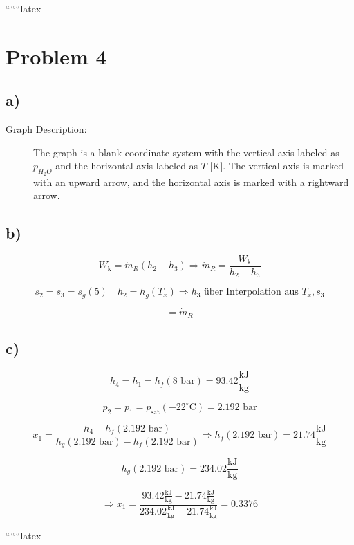 
``````latex


\section*{Problem 4}

\subsection*{a)}

\begin{description}
    \item[Graph Description:] The graph is a blank coordinate system with the vertical axis labeled as $p_{H_2O}$ and the horizontal axis labeled as $T$ [K]. The vertical axis is marked with an upward arrow, and the horizontal axis is marked with a rightward arrow.
\end{description}

\subsection*{b)}

\[
W_{\text{k}} = \dot{m}_R (h_2 - h_3) \Rightarrow \dot{m}_R = \frac{W_{\text{k}}}{h_2 - h_3}
\]

\[
s_2 = s_3 = s_g(5) \quad h_2 = h_g(T_x) \Rightarrow h_3 \text{ über Interpolation aus } T_x, s_3
\]

\[
= \dot{m}_R
\]

\subsection*{c)}

\[
h_4 = h_1 = h_f (8 \text{ bar}) = 93.42 \frac{\text{kJ}}{\text{kg}}
\]

\[
p_2 = p_1 = p_{\text{sat}} (-22^\circ \text{C}) = 2.192 \text{ bar}
\]

\[
x_1 = \frac{h_4 - h_f (2.192 \text{ bar})}{h_g (2.192 \text{ bar}) - h_f (2.192 \text{ bar})} \Rightarrow h_f (2.192 \text{ bar}) = 21.74 \frac{\text{kJ}}{\text{kg}}
\]

\[
h_g (2.192 \text{ bar}) = 234.02 \frac{\text{kJ}}{\text{kg}}
\]

\[
\Rightarrow x_1 = \frac{93.42 \frac{\text{kJ}}{\text{kg}} - 21.74 \frac{\text{kJ}}{\text{kg}}}{234.02 \frac{\text{kJ}}{\text{kg}} - 21.74 \frac{\text{kJ}}{\text{kg}}} = 0.3376
\]

``````latex



